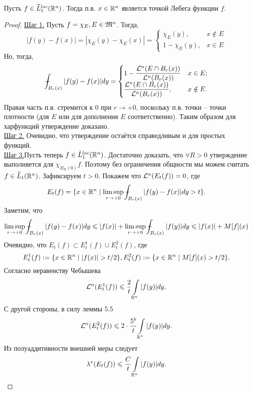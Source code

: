 \begin{theorem}
    Пусть $f \in \widetilde{L}_1^{loc}(\mathbb{R}^n)$. Тогда п.в. $x \in \mathbb{R}^n$ является точкой Лебега функции $f$.
\end{theorem}
\begin{proof} \underline{Шаг 1.}
    Пусть $f = \chi_E, E \in \mathfrak{M}^n$. Тогда,
    \begin{equation*}
        |f(y) - f(x)| = |\chi_E(y) - \chi_E(x)| = \begin{cases}
            \chi_E(y), & x \notin E \\
            1 - \chi_E(y), & x \in E
        \end{cases}
    \end{equation*}
    Но, тогда, 
    \begin{equation*}
    \dashint_{B_r(x)}|f(y) - f(x)|dy = 
    \begin{cases}
        1 - \dfrac{\LL^n(E \cap B_r(x))}{\LL^n(B_r(x))} & x \in E; \\
        \dfrac{\LL^n(E \cap B_r(x))}{\LL^n(B_r(x))}, & x \notin E.
    \end{cases}
    \end{equation*}
    Правая часть п.в. стремится к 0 при $r \rightarrow +0$, поскольку п.в. точки -- точки плотности (для $E$ или для дополнения $E$ соответственно). Таким образом для харфункций утверждение доказано. \\ \underline{Шаг 2.} Очевидно, что утверждение остаётся справедливым и для простых функций. \\ \underline{Шаг 3.}Пусть теперь $f \in \Tilde{L}_1^{loc}(\mathbb{R}^n)$. Достаточно доказать, что $\forall R > 0$ утверждение выполняется для $\chi_{B_R(0)}f$. Поэтому без ограничения общности мы можем считать $f \in \widetilde{L}_1(\mathbb{R}^n)$. Зафиксируем $t > 0$. Покажем что $\mathcal{L}^n(E_t(f)) = 0$, где \[E_t(f) = \{x \in \R^n \mid \limsup\limits_{r \rightarrow +0} \dashint_{B_r(x)}|f(y) - f(x)|dy > t\}.\]
    Заметим, что \[\limsup\limits_{r \rightarrow +0} \dashint_{B_r(x)}|f(y) - f(x)|dy \leq |f(x)| + \limsup\limits_{r \rightarrow +0}\dashint_{B_r(x)}|f(y)|dy \leq |f(x)| + M[f](x)\]
    Очевидно, что $E_t(f) \subset E_t^1(f) \cup E_t^2(f)$, где \[E_t^1(f) := \{x \in \mathbb{R}^n \mid |f(x)| > t/2\}, E_t^2(f) := \{x \in \mathbb{R}^n \mid M[f](x) > t/2\}.\] Согласно неравенству Чебышева \[\mathcal{L}^n(E^1_t(f)) \leqslant \dfrac{2}{t}\int\limits_{\mathbb{R}^n} |f(y)|dy.\]
    С другой стороны, в силу леммы 5.5 
    \[\mathcal{L}^n(E^2_t(f)) \leqslant 2 \cdot \dfrac{5^b}{t} \int\limits_{\mathbb{R}^n} |f(y)|dy.\]
    Из полуаддитивности внешней меры следует \[\lambda^*(E_t(f)) \leqslant \dfrac{C}{t}\int\limits_{\mathbb{R}^n}|f(y)|dy.\] 

\end{proof}
